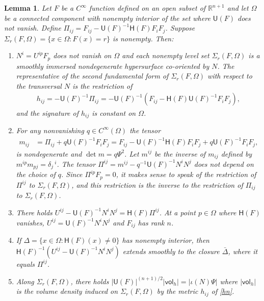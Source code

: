 \documentclass [leqno, 10pt]{amsart}
\newtheorem{lemma}[theorem]{Lemma}
\theoremstyle{definition}
\numberwithin{equation}{section}
\newcommand{\Om}{\Omega}
\newcommand{\imt}{\iota}
\newcommand{\U}{\mathsf{U}}
\newcommand{\lc}{\Sigma}
\renewcommand{\H}{\mathsf{H}}
\newcommand{\vol}{\mathsf{vol}}
\newcommand{\sff}{\Pi}
\newcommand{\cinf}{C^{\infty}}
\newcommand{\rea}{\mathbb R}
\begin{document}
\begin{lemma}\label{unondegenlemma}
Let $F$ be a $\cinf$ function defined on an open subset of $\rea^{n+1}$ and let $\Om$ be a connected component with nonempty interior of the set where $\U(F)$ does not vanish. Define $\sff_{ij} =  F_{ij} - \U(F)^{-1}\H(F)F_{i}F_{j}$. Suppose $\lc_{r}(F, \Omega) = \{x \in \Omega: F(x) = r\}$ is nonempty. Then:
\begin{enumerate}
\item\label{msff} $N^{i} = U^{ip}F_{p}$ does not vanish on $\Om$ and each nonempty level set $\lc_{r}(F, \Om)$ is a smoothly immersed nondegenerate hypersurface co-oriented by $N$. The representative of the second fundamental form of $\lc_{r}(F, \Om)$ with respect to the transversal $N$ is the restriction of
\begin{align}\label{hn}
h_{ij} = -\U(F)^{-1}\sff_{ij} = -\U(F)^{-1}\left(F_{ij} - \H(F)\U(F)^{-1}F_{i}F_{j}\right),
\end{align}
and the signature of $h_{ij}$ is constant on $\Om$. 
\item\label{upij} For any nonvanishing $q \in \cinf(\Om)$ the tensor
\begin{align}
\label{kdef}m_{ij} &= \sff_{ij} + q\U(F)^{-1}F_{i}F_{j} = F_{ij} - \U(F)^{-1}\H(F)F_{i}F_{j} + q\U(F)^{-1}F_{i}F_{j},
\end{align}
is nondegenerate and $\det m = q \Psi^{2}$. Let $m^{ij}$ be the inverse of $m_{ij}$ defined by $m^{ip}m_{pj} = \delta_{j}\,^{i}$. The tensor $\sff^{ij} =  m^{ij} - q^{-1}\U(F)^{-1}N^{i}N^{j}$ does not depend on the choice of $q$. Since $\sff^{ip}F_{p} = 0$, it makes sense to speak of the restriction of $\sff^{ij}$ to $\lc_{r}(F, \Om)$, and this restriction is the inverse to the restriction of $\sff_{ij}$ to $\lc_{r}(F, \Om)$.
\item\label{upij0} There holds $U^{ij} - \U(F)^{-1}N^{i}N^{j} = \H(F)\sff^{ij}$. 
At a point $p \in \Om$ where $\H(F)$ vanishes, $U^{ij} = \U(F)^{-1}N^{i}N^{j}$ and $F_{ij}$ has rank $n$.
\item If $\Delta = \{x \in \Om:\H(F)(x) \neq 0\}$ has nonempty interior, then $\H(F)^{-1}(U^{ij} - \U(F)^{-1}N^{i}N^{j})$ extends smoothly to the closure $\bar{\Delta}$, where it equals $\sff^{ij}$.
\item\label{uvolrelation} Along $\lc_{r}(F, \Om)$, there holds $|\U(F)|^{(n+1)/2}|\vol_{h}| = |\imt(N)\Psi|$ where $|\vol_{h}|$ is the volume density induced on $\lc_{r}(F, \Om)$ by the metric $h_{ij}$ of \eqref{hn}.
\end{enumerate}
\end{lemma}
\end{document}
